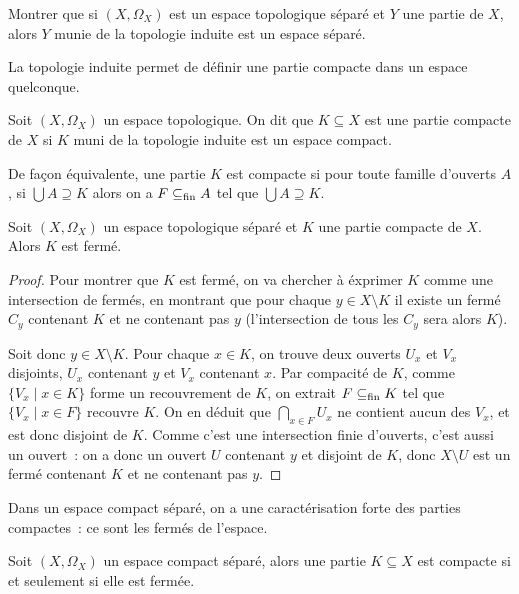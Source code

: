 \begin{exercise}
  Montrer que si $(X,\Omega_X)$ est un espace topologique séparé et $Y$ une
  partie de $X$, alors $Y$ munie de la topologie induite est un espace séparé.
\end{exercise}

La topologie induite permet de définir une partie compacte dans un espace
quelconque.

\begin{definition}
  Soit $(X,\Omega_X)$ un espace topologique. On dit que $K\subseteq X$ est une
  partie compacte de $X$ si $K$ muni de la topologie induite est un espace
  compact.
\end{definition}

\begin{remark}
  De façon équivalente, une partie $K$ est compacte si pour toute famille
  d'ouverts $A$, si $\bigcup A \supseteq K$ alors on a $F\subseteq_{\mathrm{fin}} A$ tel que
  $\bigcup A \supseteq K$.
\end{remark}

\begin{property}
  Soit $(X,\Omega_X)$ un espace topologique séparé et $K$ une partie compacte de
  $X$. Alors $K$ est fermé.
\end{property}

\begin{proof}
  Pour montrer que $K$ est fermé, on va chercher à éxprimer $K$ comme une
  intersection de fermés, en montrant que pour chaque $y\in X\setminus K$ il
  existe un fermé $C_y$ contenant $K$ et ne contenant pas $y$ (l'intersection
  de tous les $C_y$ sera alors $K$).

  Soit donc $y\in X\setminus K$. Pour chaque $x\in K$, on trouve deux ouverts
  $U_x$ et $V_x$ disjoints, $U_x$ contenant $y$ et $V_x$ contenant $x$. Par
  compacité de $K$, comme $\{V_x\mid x \in K\}$ forme un recouvrement de $K$,
  on extrait $F\subseteq_{\mathrm{fin}} K$ tel que $\{V_x\mid x \in F\}$ recouvre $K$.
  On en déduit que $\displaystyle\bigcap_{x\in F}U_x$ ne contient aucun des
  $V_x$, et est donc disjoint de $K$. Comme c'est une intersection finie
  d'ouverts, c'est aussi un ouvert~: on a donc un ouvert $U$ contenant
  $y$ et disjoint de $K$, donc $X\setminus U$ est un fermé contenant $K$ et
  ne contenant pas $y$.
\end{proof}

Dans un espace compact séparé, on a une caractérisation forte des parties
compactes~: ce sont les fermés de l'espace.

\begin{proposition}\label{prop.compac.equiv.ferme}
  Soit $(X,\Omega_X)$ un espace compact séparé, alors une partie $K\subseteq X$
  est compacte si et seulement si elle est fermée.
\end{proposition}

